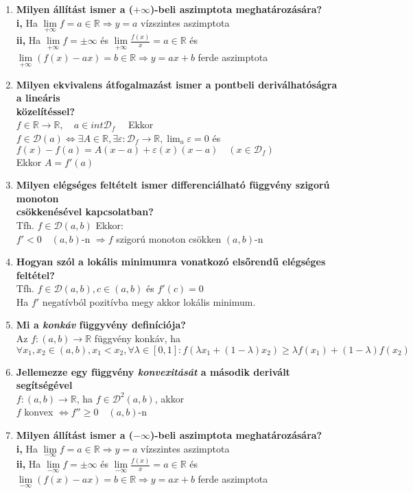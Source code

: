 \documentclass[a4paper,11pt]{article}
\begin{document}
\def\N{\mathbb{N}}
\def\Z{\mathbb{Z}}
\def\R{\mathbb{R}}
\def\rtr{\R\to\R}
\def\D{\mathcal{D}}
\def\cab{\in C[a,b]}
\def\dab{\in\D(a,b)}
\def\fda{f\in\D(a)}
\def\lima{\displaystyle\lim_{a}}
\def\fabr{f:(a,b)\to\R}
\begin{enumerate}
	\item \textbf{Milyen állítást ismer a ($+\infty$)-beli aszimptota meghatározására?}\\[0.1cm]
	\textbf{i,} Ha $\lim\limits_{+\infty}f=a\in\R\Rightarrow y=a$ vízszintes aszimptota
	\\[0.1cm]\textbf{ii,} Ha $\lim\limits_{+\infty}f=\pm\infty$ és $\lim\limits_{+\infty}	\frac{f(x)}{x}=a\in\R$ és $\lim\limits_{+\infty}(f(x)-ax)=
	b\in\R\Rightarrow y=ax+b$ ferde aszimptota
	\item \textbf{Milyen ekvivalens átfogalmazást ismer a pontbeli deriválhatóságra a lineáris \\ közelítéssel?}\\[0.1cm]$f\in\rtr,\quad a\in int\D_f\quad$ Ekkor\\[0.1cm]$\fda\Leftrightarrow\exists A\in\R, \exists\varepsilon:\D_f\to\R,\lima\varepsilon=0$ és $f(x)-f(a)=A(x-a)+ \varepsilon(x)(x-a)\quad(x\in\D_f)$\\[0.1cm]Ekkor $A=f'(a)$
	\item \textbf{Milyen elégséges feltételt ismer differenciálható függvény szigorú monoton \\ csökkenésével kapcsolatban?}\\[0.1cm]Tfh. $f\dab$ Ekkor: \\[0.1cm]\hspace*{0.3cm} $f'<0\quad (a,b)$-n $\Rightarrow f$ szigorú monoton csökken $(a,b)$-n
	\item \textbf{Hogyan szól a lokális minimumra vonatkozó elsőrendű elégséges feltétel?}\\[0.1cm]Tfh. $f\dab,c\in(a,b)$ és $f'(c)=0$\\[0.1cm]Ha $f'$ negatívból pozitívba megy akkor lokális minimum.
	\item \textbf{Mi a \textit{konkáv} függyvény definíciója?}\\[0.1cm]
	Az $\fabr$ függvény konkáv, ha\\[0.1cm]
	$\forall x_1,x_2\in(a,b),x_1<x_2,\forall\lambda\in[0,1]:f(\lambda
	x_1+(1-\lambda)x_2)\geq\lambda f(x_1)+(1-\lambda)f(x_2)$
	\item \textbf{Jellemezze egy függvény \textit{konvexitását} a második derivált segítségével}\\[0.1cm]
	$\fabr$, ha $f\in\D^2(a,b)$, akkor\\[0.1cm]
	$f$ konvex $\Leftrightarrow f''\geq0\quad(a,b)$-n
	\item \textbf{Milyen állítást ismer a ($-\infty$)-beli aszimptota meghatározására?}\\[0.1cm]
	\textbf{i,} Ha $\lim\limits_{-\infty}f=a\in\R\Rightarrow y=a$ vízszintes aszimptota
	\\[0.1cm]\textbf{ii,} Ha $\lim\limits_{-\infty}f=\pm\infty$ és $\lim\limits_{-\infty}	\frac{f(x)}{x}=a\in\R$ és $\lim\limits_{-\infty}(f(x)-ax)=
	b\in\R\Rightarrow y=ax+b$ ferde aszimptota
\end{enumerate}
\end{document}
